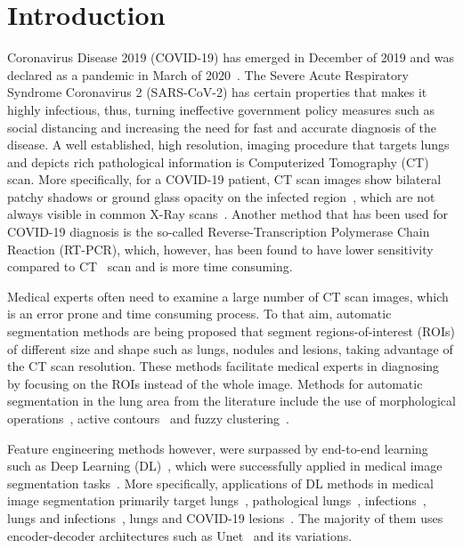 \documentclass{elsarticle}
\begin{document}
\section{Introduction}\label{sec:introduction}
Coronavirus Disease 2019 (COVID-19) has emerged in December of 2019
and was declared as a pandemic in March of 2020~\cite{world2020coronavirus}.
The Severe Acute Respiratory Syndrome Coronavirus 2 (SARS-CoV-2) has
certain properties that makes it highly infectious, thus, turning
ineffective government policy measures such as social distancing and
increasing the need for fast and accurate diagnosis of the disease.
A well established, high resolution, imaging procedure that targets
lungs and depicts rich pathological information is Computerized
Tomography (CT) scan.
More specifically, for a COVID-19 patient, CT scan images show
bilateral patchy shadows or ground glass opacity on the infected
region~\cite{wang2020clinical}, which are not always visible in
common X-Ray scans~\cite{ng2020imaging}.
Another method that has been used for COVID-19 diagnosis is the
so-called Reverse-Transcription Polymerase Chain Reaction (RT-PCR),
which, however, has been found to have lower sensitivity compared to
CT~\cite{ai2020correlation} scan and is more time consuming.

Medical experts often need to examine a large number of CT scan
images, which is an error prone and time consuming process.
To that aim, automatic segmentation methods are being proposed that
segment regions-of-interest (ROIs) of different size and shape such
as lungs, nodules and lesions, taking advantage of the CT scan resolution.
These methods facilitate medical experts in diagnosing by focusing on
the ROIs instead of the whole image.
Methods for automatic segmentation in the lung area from the
literature include the use of morphological
operations~\cite{hu2001automatic}, active
contours~\cite{keshani2013lung} and fuzzy clustering~\cite{manikandan2016lung}.

Feature engineering methods however, were surpassed by end-to-end
learning such as Deep Learning (DL)~\cite{lecun2015deep}, which were
successfully applied in medical image segmentation tasks~\cite{minaee2020image}.
More specifically, applications of DL methods in medical image
segmentation primarily target lungs~\cite{skourt2018lung, jin2020ai},
pathological lungs~\cite{harrison2017progressive},
infections~\cite{fan2020inf, chen2020residual, wang2020noise}, lungs
and infections~\cite{yan2020covid}, lungs and COVID-19
lesions~\cite{shan2020lung}.
The majority of them uses encoder-decoder architectures such as
Unet~\cite{ronneberger2015u} and its variations.
\end{document}
